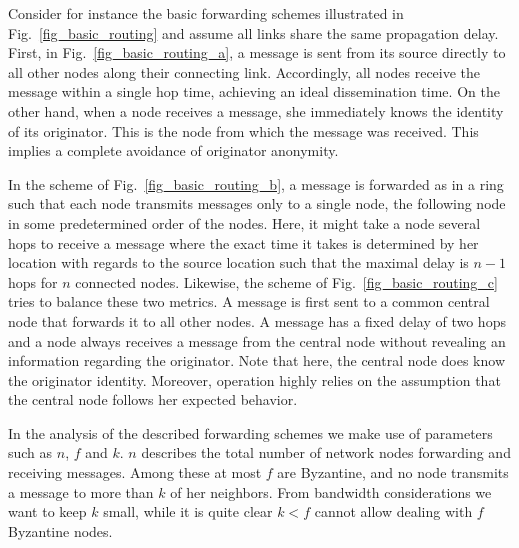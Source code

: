 Consider for instance the  basic forwarding schemes illustrated in Fig.~\ref{fig_basic_routing} and assume all links share the same propagation delay. First, in Fig.~\ref{fig_basic_routing_a}, a message is sent from its source directly to all other nodes along their connecting link. Accordingly, all nodes receive the message within a single hop time, achieving an ideal dissemination time.  On the other hand, when a node receives a message, she immediately  knows the identity of its originator. This is the node from which the message was received.  This implies a complete avoidance of originator anonymity. 

In the scheme of Fig.~\ref{fig_basic_routing_b}, a message is forwarded as in a ring such that each node transmits messages only to a single node, the following node in some predetermined order of the nodes. Here, it might take a node several hops to receive a message where the exact time it takes  is determined by her location with regards to the source location such that the maximal delay is $n-1$ hops for $n$ connected nodes. 
Likewise,  the scheme of Fig.~\ref{fig_basic_routing_c} tries to balance these two metrics. A message is first sent to a common central node that forwards it to all other nodes. A message has a fixed delay of two hops and a node always receives a message from the central node without revealing an information regarding the originator. Note that here, the central node does know the originator identity. Moreover, operation highly relies on the assumption that the central node follows her expected behavior. 

In the analysis of the  described forwarding schemes we make use of parameters such as $n$, $f$ and $k$. $n$ describes the total number of network nodes forwarding and receiving messages. Among these  at most $f$ are Byzantine, and no node transmits a message to more than $k$ of her neighbors. 
From bandwidth considerations we want to keep $k$ small, while it is quite clear $k<f$ cannot allow dealing with $f$ Byzantine nodes.

